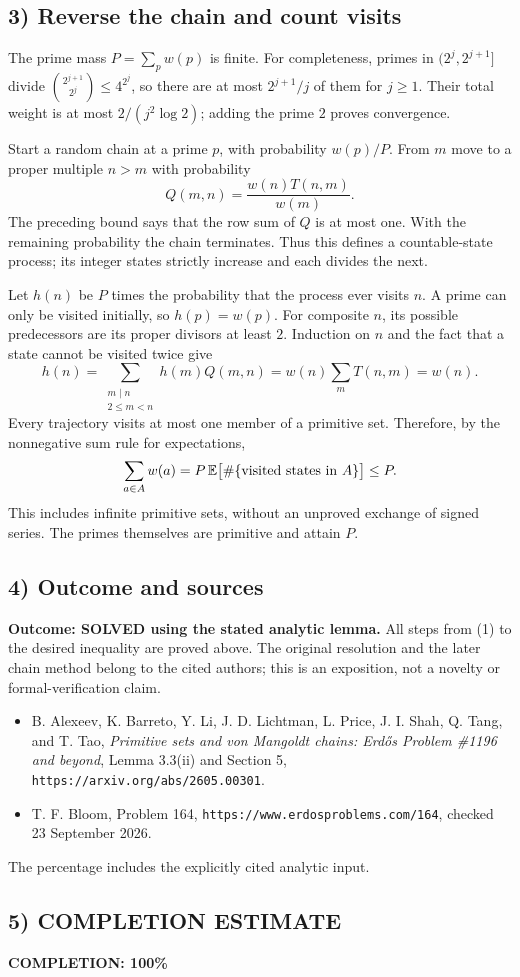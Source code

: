 \subsection{3) Reverse the chain and count visits}
The prime mass $P=\sum_p w(p)$ is finite. For completeness, primes in
$(2^j,2^{j+1}]$ divide $\binom{2^{j+1}}{2^j}\leq4^{2^j}$, so there
are at most $2^{j+1}/j$ of them for $j\geq1$. Their total weight is at
most $2/(j^2\log2)$; adding the prime $2$ proves convergence.

Start a random chain at a prime $p$, with probability $w(p)/P$.
From $m$ move to a proper multiple $n>m$ with probability
\[
 Q(m,n)=\frac{w(n)T(n,m)}{w(m)}.
\]
The preceding bound says that the row sum of $Q$ is at most one.
With the remaining probability the chain terminates. Thus this defines
a countable-state process; its integer states strictly increase and
each divides the next.

Let $h(n)$ be $P$ times the probability that the process ever visits
$n$. A prime can only be visited initially, so $h(p)=w(p)$. For composite
$n$, its possible predecessors are its proper divisors at least $2$.
Induction on $n$ and the fact that a state cannot be visited twice give
\[
 h(n)=\sum_{\substack{m\mid n\\2\leq m<n}}h(m)Q(m,n)
 =w(n)\sum_m T(n,m)=w(n).
\]
Every trajectory visits at most one member of a primitive set. Therefore,
by the nonnegative sum rule for expectations,
\[
 \sum_{a\in A}w(a)
 =P\,\mathbb E\bigl[\#\{\hbox{visited states in }A\}\bigr]\leq P.
\]
This includes infinite primitive sets, without an unproved exchange of
signed series. The primes themselves are primitive and attain $P$.

\subsection{4) Outcome and sources}
\textbf{Outcome: SOLVED using the stated analytic lemma.} All steps from
(1) to the desired inequality are proved above. The original resolution
and the later chain method belong to the cited authors; this is an
exposition, not a novelty or formal-verification claim.
\begin{itemize}
\item B. Alexeev, K. Barreto, Y. Li, J. D. Lichtman, L. Price,
J. I. Shah, Q. Tang, and T. Tao, \emph{Primitive sets and von Mangoldt
chains: Erd\H{o}s Problem \#1196 and beyond}, Lemma 3.3(ii) and Section 5,
\texttt{https://arxiv.org/abs/2605.00301}.
\item T. F. Bloom, Problem 164,
\texttt{https://www.erdosproblems.com/164}, checked 23 September 2026.
\end{itemize}
The percentage includes the explicitly cited analytic input.
\subsection{5) COMPLETION ESTIMATE}
\textbf{COMPLETION: 100\%}
